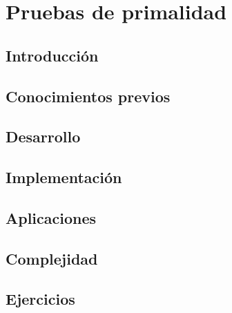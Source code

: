 \chapter{Pruebas de primalidad}
\section{Introducción}

\section{Conocimientos previos}

\section{Desarrollo}

\section{Implementación}

\section{Aplicaciones}

\section{Complejidad}

\section{Ejercicios}
